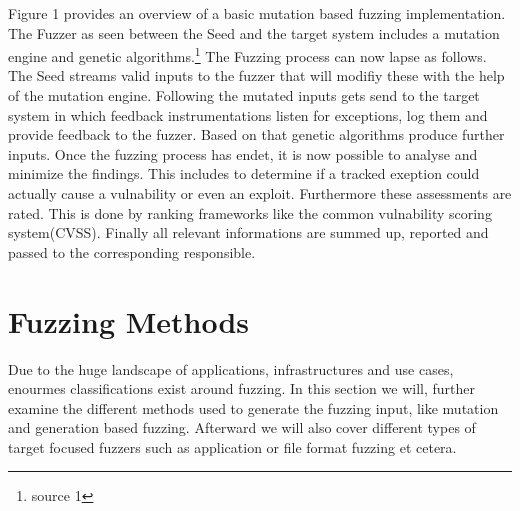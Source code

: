 \documentclass[journal=tosc,final]{iacrtrans}
\begin{document}
\noindent Figure 1 provides an overview of a basic mutation based fuzzing implementation. The Fuzzer as seen between the Seed and the target system includes a mutation engine and genetic algorithms.\footnote{source 1} The Fuzzing process can now lapse as follows.\\
The Seed streams valid inputs to the fuzzer that will modifiy these with the help of the mutation engine. Following the mutated inputs gets send to the target system in which feedback instrumentations listen for exceptions, log them and provide feedback to the fuzzer. Based on that genetic algorithms produce further inputs. Once the fuzzing process has endet, it is now possible to analyse and minimize the findings. This includes to determine if a tracked exeption could actually cause a vulnability or even an exploit. Furthermore these assessments are rated. This is done by ranking frameworks like the common vulnability scoring system(CVSS). Finally all relevant informations are summed up, reported and passed to the corresponding responsible. 



\newpage
\section{Fuzzing Methods}
Due to the huge landscape of applications, infrastructures and use cases, enourmes classifications exist around fuzzing. In this section we will, further examine the different methods used to generate the fuzzing input, like mutation and generation based fuzzing. Afterward we will also cover different types of target focused fuzzers such as application or file format fuzzing et cetera. 
\end{document}
